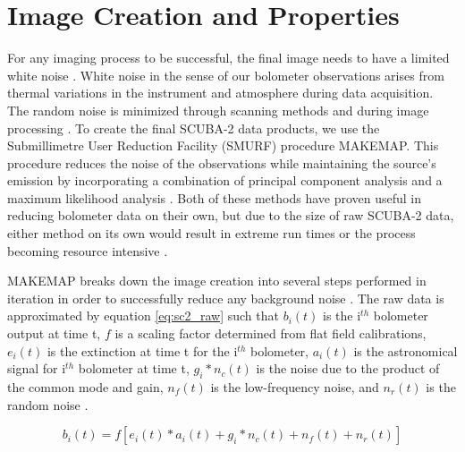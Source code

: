 \section{Image Creation and Properties}

For any imaging process to be successful, the final image needs to have a limited white noise \citep{chapin2013}.  White noise in the sense of our bolometer observations arises from thermal variations in the instrument and atmosphere during data acquisition. The random noise is minimized through scanning methods and during image processing \citep{chapin2013}.  To create the final SCUBA-2 data products, we use the Submillimetre User Reduction Facility (SMURF) procedure MAKEMAP.  This procedure reduces the noise of the observations while maintaining the source's emission by incorporating a combination of principal component analysis and a maximum likelihood analysis \citep{chapin2013}.  Both of these methods have proven useful in reducing bolometer data on their own, but due to the size of raw SCUBA-2 data, either method on its own would result in extreme run times or the process becoming resource intensive \citep{chapin2013}.


MAKEMAP breaks down the image creation into several steps performed in iteration in order to successfully reduce any background noise \citep{chapin2013}.  The raw data is approximated by equation \ref{eq:sc2_raw} such that $b_i(t)$ is the i$^{th}$ bolometer output at time t, $f$ is a scaling factor determined from flat field calibrations, $e_i(t)$ is the extinction at time t for the i$^{th}$ bolometer, $a_i(t)$ is the astronomical signal for i$^{th}$ bolometer at time t,  $g_i*n_c(t)$ is the noise due to the product of the common mode and gain,  $n_f(t)$ is the low-frequency noise, and  $n_r(t)$ is the random noise \citep{chapin2013}.

\begin{equation}\label{eq:sc2_raw}
  b_i(t) = f \left[ e_i(t)*a_i(t) + g_i*n_c(t)+n_f(t)+n_r(t)\right]
\end{equation}

